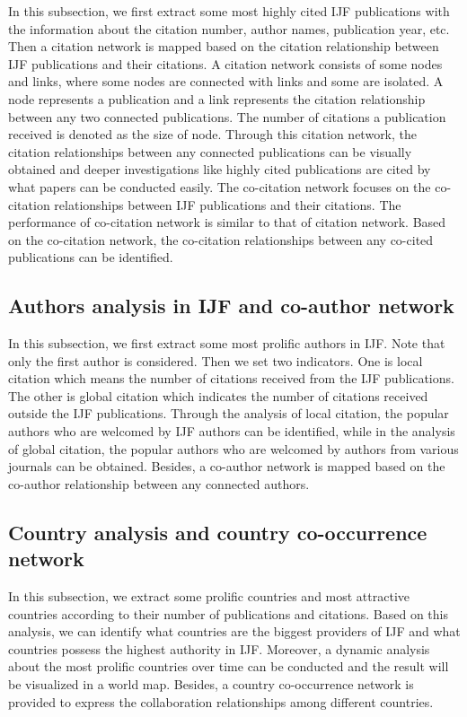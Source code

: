 \documentclass[11pt,a4paper]{elsarticle} %
\begin{document}
In this subsection, we first extract some most highly cited IJF
publications with the information about the citation number, author
names, publication year, etc. Then a citation network is mapped based on
the citation relationship between IJF publications and their citations.
A citation network consists of some nodes and links, where some nodes
are connected with links and some are isolated. A node represents a
publication and a link represents the citation relationship between any
two connected publications. The number of citations a publication
received is denoted as the size of node. Through this citation network,
the citation relationships between any connected publications can be
visually obtained and deeper investigations like highly cited
publications are cited by what papers can be conducted easily. The
co-citation network focuses on the co-citation relationships between IJF
publications and their citations. The performance of co-citation network
is similar to that of citation network. Based on the co-citation
network, the co-citation relationships between any co-cited publications
can be identified.

\subsection{Authors analysis in IJF and co-author
network}\label{authors-analysis-in-ijf-and-co-author-network}

In this subsection, we first extract some most prolific authors in IJF.
Note that only the first author is considered. Then we set two
indicators. One is local citation which means the number of citations
received from the IJF publications. The other is global citation which
indicates the number of citations received outside the IJF publications.
Through the analysis of local citation, the popular authors who are
welcomed by IJF authors can be identified, while in the analysis of
global citation, the popular authors who are welcomed by authors from
various journals can be obtained. Besides, a co-author network is mapped
based on the co-author relationship between any connected authors.

\subsection{Country analysis and country co-occurrence
network}\label{country-analysis-and-country-co-occurrence-network}

In this subsection, we extract some prolific countries and most
attractive countries according to their number of publications and
citations. Based on this analysis, we can identify what countries are
the biggest providers of IJF and what countries possess the highest
authority in IJF. Moreover, a dynamic analysis about the most prolific
countries over time can be conducted and the result will be visualized
in a world map. Besides, a country co-occurrence network is provided to
express the collaboration relationships among different countries.
\end{document}
